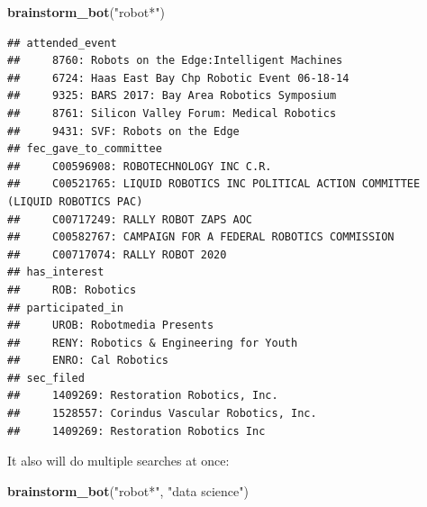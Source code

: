 \documentclass[]{book}
\newenvironment{Shaded}{\begin{snugshade}}{\end{snugshade}}
\newcommand{\KeywordTok}[1]{\textcolor[rgb]{0.13,0.29,0.53}{\textbf{#1}}}
\newcommand{\NormalTok}[1]{#1}
\newcommand{\StringTok}[1]{\textcolor[rgb]{0.31,0.60,0.02}{#1}}
\begin{document}
\begin{Shaded}
\begin{Highlighting}[]
\KeywordTok{brainstorm_bot}\NormalTok{(}\StringTok{"robot*"}\NormalTok{)}
\end{Highlighting}
\end{Shaded}

\begin{verbatim}
## attended_event 
##     8760: Robots on the Edge:Intelligent Machines
##     6724: Haas East Bay Chp Robotic Event 06-18-14
##     9325: BARS 2017: Bay Area Robotics Symposium
##     8761: Silicon Valley Forum: Medical Robotics
##     9431: SVF: Robots on the Edge
## fec_gave_to_committee 
##     C00596908: ROBOTECHNOLOGY INC C.R.
##     C00521765: LIQUID ROBOTICS INC POLITICAL ACTION COMMITTEE (LIQUID ROBOTICS PAC)
##     C00717249: RALLY ROBOT ZAPS AOC
##     C00582767: CAMPAIGN FOR A FEDERAL ROBOTICS COMMISSION
##     C00717074: RALLY ROBOT 2020
## has_interest 
##     ROB: Robotics
## participated_in 
##     UROB: Robotmedia Presents
##     RENY: Robotics & Engineering for Youth
##     ENRO: Cal Robotics
## sec_filed 
##     1409269: Restoration Robotics, Inc.
##     1528557: Corindus Vascular Robotics, Inc.
##     1409269: Restoration Robotics Inc
\end{verbatim}

It also will do multiple searches at once:

\begin{Shaded}
\begin{Highlighting}[]
\KeywordTok{brainstorm_bot}\NormalTok{(}\StringTok{"robot*"}\NormalTok{, }\StringTok{"data science"}\NormalTok{)}
\end{Highlighting}
\end{Shaded}
\end{document}
